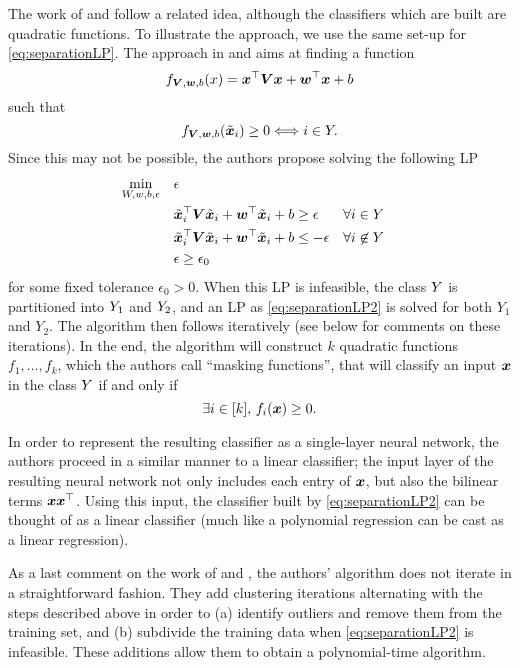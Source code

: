 The work of \cite{roy1993polynomial} and \cite{mukhopadhyay1993polynomial} follow a related idea, although the classifiers which are built are quadratic functions. To illustrate the approach, we use the same set-up for \eqref{eq:separationLP}. The approach in \cite{roy1993polynomial} and \cite{mukhopadhyay1993polynomial} aims at finding a function
\[f_{{\bm{V}},{\bm{w}},b}(x) = {\bm{x}}^\top {\bm{V}} {\bm{x}} + {\bm{w}}^\top {\bm{x}} + b \]
such that
\[f_{{\bm{V}},{\bm{w}},b}(\tilde{{\bm{x}}}_i) \geq 0 \Longleftrightarrow i\in Y.\]
%
Since this may not be possible, the authors propose solving the following LP
%
\begin{subequations}\label{eq:separationLP2}
\begin{align}
    \min_{W,w,b,\epsilon} \quad & \epsilon \\
    & \tilde{{\bm{x}}}_i^\top {\bm{V}} \tilde{{\bm{x}}}_i + {\bm{w}}^\top\tilde{{\bm{x}}}_i + b  \geq \epsilon && \forall i\in Y \\
    & \tilde{{\bm{x}}}_i^\top {\bm{V}} \tilde{{\bm{x}}}_i + {\bm{w}}^\top\tilde{{\bm{x}}}_i + b  \leq -\epsilon && \forall i\not\in Y \\
    & \epsilon \geq \epsilon_0
\end{align}
\end{subequations}
%
for some fixed tolerance $\epsilon_0 >0$. When this LP is infeasible, the class $Y$ is partitioned into $Y_1$ and $Y_2$, and an LP as \eqref{eq:separationLP2} is solved for both $Y_1$ and $Y_2$. The algorithm then follows iteratively (see below for comments on these iterations). In the end, the algorithm will construct $k$ quadratic functions $f_1, \ldots, f_k$, which the authors call ``masking functions'', that will classify an input ${\bm{x}}$ in the class $Y$ if and only if
\[\exists i\in [k],\, f_i({\bm{x}}) \geq 0.\]

In order to represent the resulting classifier as a single-layer neural network, the authors proceed in a similar manner to a linear classifier; the input layer of the resulting neural network not only includes each entry of ${\bm{x}}$, but also the bilinear terms ${\bm{x}}{\bm{x}}^\top$. Using this input, the classifier built by \eqref{eq:separationLP2} can be thought of as a linear classifier (much like a polynomial regression can be cast as a linear regression).

As a last comment on the work of \cite{roy1993polynomial} and  \cite{mukhopadhyay1993polynomial}, the authors' algorithm does not iterate in a straightforward fashion. They add clustering iterations alternating with the steps described above in order to (a) identify outliers and remove them from the training set, and  (b) subdivide the training data when \eqref{eq:separationLP2} is infeasible. These additions allow them to obtain a polynomial-time algorithm.\\

